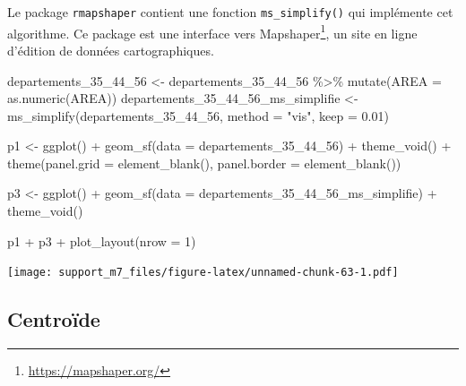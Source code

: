 \documentclass[
]{book}
\newenvironment{Shaded}{\begin{snugshade}}{\end{snugshade}}
\newcommand{\AttributeTok}[1]{\textcolor[rgb]{0.77,0.63,0.00}{#1}}
\newcommand{\DecValTok}[1]{\textcolor[rgb]{0.00,0.00,0.81}{#1}}
\newcommand{\FloatTok}[1]{\textcolor[rgb]{0.00,0.00,0.81}{#1}}
\newcommand{\FunctionTok}[1]{\textcolor[rgb]{0.00,0.00,0.00}{#1}}
\newcommand{\NormalTok}[1]{#1}
\newcommand{\OtherTok}[1]{\textcolor[rgb]{0.56,0.35,0.01}{#1}}
\newcommand{\SpecialCharTok}[1]{\textcolor[rgb]{0.00,0.00,0.00}{#1}}
\newcommand{\StringTok}[1]{\textcolor[rgb]{0.31,0.60,0.02}{#1}}
\begin{document}
Le package \texttt{rmapshaper} contient une fonction \texttt{ms\_simplify()} qui implémente cet algorithme.
Ce package est une interface vers Mapshaper\footnote{\url{https://mapshaper.org/}}, un site en ligne d'édition de données cartographiques.

\begin{Shaded}
\begin{Highlighting}[]
\NormalTok{departements\_35\_44\_56 }\OtherTok{\textless{}{-}}\NormalTok{ departements\_35\_44\_56 }\SpecialCharTok{\%\textgreater{}\%}
  \FunctionTok{mutate}\NormalTok{(}\AttributeTok{AREA =} \FunctionTok{as.numeric}\NormalTok{(AREA))}
\NormalTok{departements\_35\_44\_56\_ms\_simplifie }\OtherTok{\textless{}{-}} \FunctionTok{ms\_simplify}\NormalTok{(departements\_35\_44\_56, }\AttributeTok{method =} \StringTok{"vis"}\NormalTok{, }\AttributeTok{keep =} \FloatTok{0.01}\NormalTok{)}
\end{Highlighting}
\end{Shaded}

\begin{Shaded}
\begin{Highlighting}[]
\NormalTok{p1 }\OtherTok{\textless{}{-}} \FunctionTok{ggplot}\NormalTok{() }\SpecialCharTok{+} 
  \FunctionTok{geom\_sf}\NormalTok{(}\AttributeTok{data =}\NormalTok{ departements\_35\_44\_56) }\SpecialCharTok{+} 
  \FunctionTok{theme\_void}\NormalTok{() }\SpecialCharTok{+} 
  \FunctionTok{theme}\NormalTok{(}\AttributeTok{panel.grid =} \FunctionTok{element\_blank}\NormalTok{(), }\AttributeTok{panel.border =} \FunctionTok{element\_blank}\NormalTok{())}

\NormalTok{p3 }\OtherTok{\textless{}{-}} \FunctionTok{ggplot}\NormalTok{() }\SpecialCharTok{+} 
  \FunctionTok{geom\_sf}\NormalTok{(}\AttributeTok{data =}\NormalTok{ departements\_35\_44\_56\_ms\_simplifie) }\SpecialCharTok{+} 
  \FunctionTok{theme\_void}\NormalTok{()}

\NormalTok{p1 }\SpecialCharTok{+}\NormalTok{ p3 }\SpecialCharTok{+} \FunctionTok{plot\_layout}\NormalTok{(}\AttributeTok{nrow =} \DecValTok{1}\NormalTok{)}
\end{Highlighting}
\end{Shaded}

\texttt{[image: support\_m7\_files/figure-latex/unnamed-chunk-63-1.pdf]}

\hypertarget{centrouxefde}{%
\subsection{Centroïde}\label{centrouxefde}}
\end{document}
